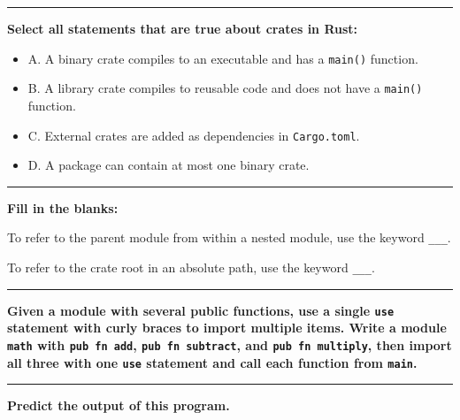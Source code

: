 \documentclass[
  11pt,
]{article}
\newenvironment{Shaded}{}{}
\providecommand{\tightlist}{%
  \setlength{\itemsep}{0pt}\setlength{\parskip}{0pt}}
\begin{document}
\begin{center}\rule{0.5\linewidth}{0.5pt}\end{center}

\textbf{Select all statements that are true about crates in Rust:}

\begin{itemize}
\tightlist
\item[$\square$]
  A. A binary crate compiles to an executable and has a \texttt{main()}
  function.
\item[$\square$]
  B. A library crate compiles to reusable code and does not have a
  \texttt{main()} function.
\item[$\square$]
  C. External crates are added as dependencies in \texttt{Cargo.toml}.
\item[$\square$]
  D. A package can contain at most one binary crate.
\end{itemize}

\begin{center}\rule{0.5\linewidth}{0.5pt}\end{center}

\textbf{Fill in the blanks:}

To refer to the parent module from within a nested module, use the
keyword \texttt{\_\_\_}.

To refer to the crate root in an absolute path, use the keyword
\texttt{\_\_\_}.

\begin{center}\rule{0.5\linewidth}{0.5pt}\end{center}

\textbf{Given a module with several public functions, use a single
\texttt{use} statement with curly braces to import multiple items. Write
a module \texttt{math} with \texttt{pub\ fn\ add},
\texttt{pub\ fn\ subtract}, and \texttt{pub\ fn\ multiply}, then import
all three with one \texttt{use} statement and call each function from
\texttt{main}.}

\begin{Shaded}
\begin{Highlighting}[]

\end{Highlighting}
\end{Shaded}

\begin{center}\rule{0.5\linewidth}{0.5pt}\end{center}

\textbf{Predict the output of this program.}
\end{document}
